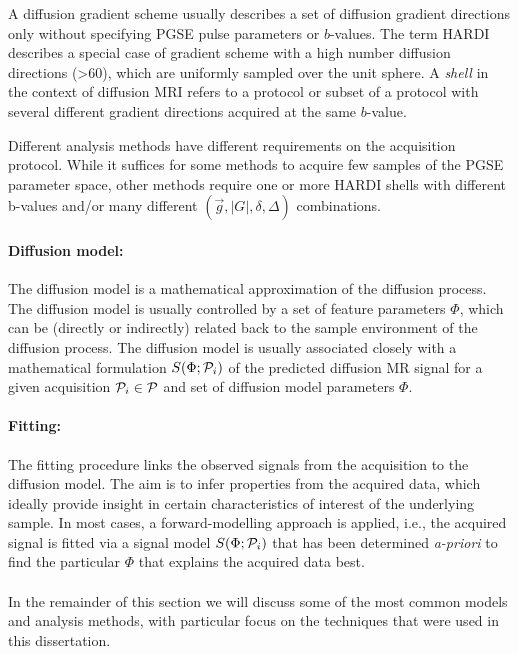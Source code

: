 A diffusion gradient scheme usually describes a set of diffusion gradient directions only without specifying PGSE pulse parameters or $b$-values. The term \gls{HARDI} describes a special case of gradient scheme with a high number diffusion directions (>60), which are uniformly sampled over the unit sphere\citep{Tuch:2002,Tournier:2011}. A \textit{shell} in the context of diffusion MRI refers to a protocol or subset of a protocol with several different gradient directions acquired at the same $b$-value. 


Different analysis methods have different requirements on the acquisition protocol. While it suffices for some methods to acquire few samples of the PGSE parameter space, other methods require one or more HARDI shells with different b-values and/or many different $(\vec{g},|G|,\delta,\Delta)$ combinations. 


\paragraph{Diffusion model:} The diffusion model is a mathematical approximation of the diffusion process. The diffusion model is usually controlled by a set of feature parameters $\Phi$, which can be (directly or indirectly) related back to the sample environment of the diffusion process. The diffusion model is usually associated closely with a mathematical formulation $S(\Phi;\mathcal{P}_i)$ of the predicted diffusion MR signal for a given acquisition $\mathcal{P}_i \in \mathcal{P}$ and set of diffusion model parameters $\Phi$.
\paragraph{Fitting:} The fitting procedure links the observed signals from the acquisition to the diffusion model. The aim is to infer properties from the acquired data, which ideally provide insight in certain characteristics of interest of the underlying sample. In most cases, a forward-modelling approach is applied, i.e., the acquired signal is fitted via a signal model $S(\Phi;\mathcal{P}_i)$ that has been determined \emph{a-priori} to find the particular $\Phi$ that explains the acquired data best.  
\paragraph{}
In the remainder of this section we will discuss some of the most common models and analysis methods, with particular focus on the techniques that were used in this dissertation. 
